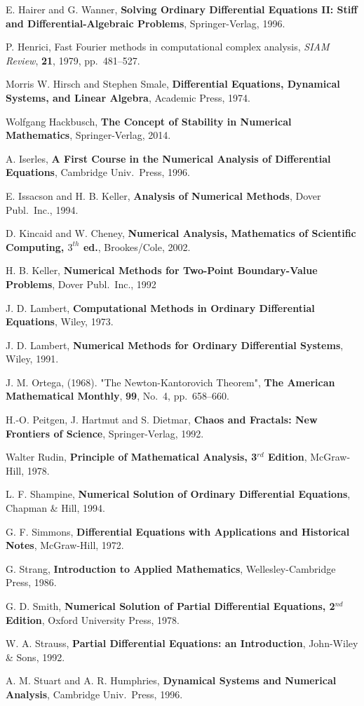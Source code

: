 \begin{thebibliography}{99}
 E. Hairer and G. Wanner, {\bfseries Solving Ordinary
Differential Equations II: Stiff and Differential-Algebraic Problems},
Springer-Verlag, 1996.

 P. Henrici, Fast Fourier methods in computational complex
analysis, {\em SIAM Review}, {\bfseries 21}, 1979, pp.\ 481--527.

 Morris W. Hirsch and Stephen Smale, {\bfseries Differential
Equations, Dynamical Systems, and Linear Algebra}, Academic Press,
1974.

 Wolfgang Hackbusch, {\bfseries The Concept of Stability
in Numerical Mathematics}, Springer-Verlag, 2014.

 A. Iserles, {\bfseries A First Course in the Numerical
Analysis of Differential Equations}, Cambridge Univ.\ Press, 1996.

 E. Issacson and H. B. Keller, {\bfseries Analysis of
Numerical Methods}, Dover Publ.\ Inc., 1994.

 D. Kincaid and W. Cheney, {\bfseries Numerical Analysis,
Mathematics of Scientific Computing, $3^{th}$ ed.}, Brookes/Cole,
2002.

 H. B. Keller, {\bfseries Numerical Methods for Two-Point
Boundary-Value Problems}, Dover Publ.\ Inc., 1992
  
 J. D. Lambert, {\bfseries Computational Methods in
Ordinary Differential Equations}, Wiley, 1973.

 J. D. Lambert, {\bfseries Numerical Methods for Ordinary
Differential Systems}, Wiley, 1991.

 J. M. Ortega, (1968). "The Newton-Kantorovich Theorem",
{\bfseries The American Mathematical Monthly}, {\bfseries 99}, No.\ 4,
pp.\ 658–660.

 H.-O. Peitgen, J. Hartmut and S. Dietmar, {\bfseries
Chaos and Fractals: New Frontiers of Science}, Springer-Verlag, 1992.

 Walter Rudin, {\bfseries Principle of Mathematical Analysis,
3$^{rd}$ Edition}, McGraw-Hill, 1978.

 L. F. Shampine, {\bfseries Numerical Solution of Ordinary
Differential Equations}, Chapman \& Hill, 1994.

 G. F. Simmons, {\bfseries Differential Equations with
Applications and Historical Notes}, McGraw-Hill, 1972.

 G. Strang, {\bfseries Introduction to Applied
Mathematics}, Wellesley-Cambridge Press, 1986.

 G. D. Smith, {\bfseries Numerical Solution of Partial
Differential Equations, 2$^{nd}$ Edition}, Oxford University Press, 1978.

 W. A. Strauss, {\bfseries Partial Differential
Equations: an Introduction}, John-Wiley \& Sons, 1992.

 A. M. Stuart and A. R. Humphries, {\bfseries Dynamical
Systems and Numerical Analysis}, Cambridge Univ.\ Press, 1996.

\end{thebibliography}


